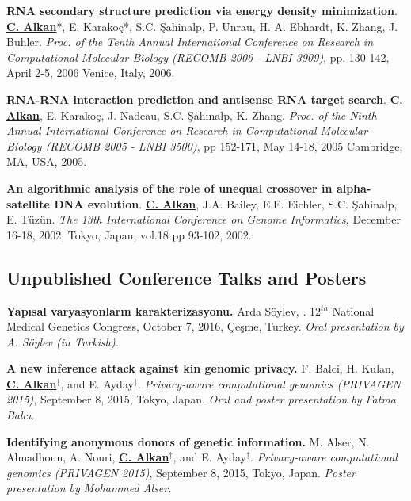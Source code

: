 \vspace{-.2cm}
{\bf RNA secondary structure prediction via energy density minimization}.
{\bf {\underline{C. Alkan}}}*, E. Karako\c{c}*, S.C. \c{S}ahinalp, P. Unrau,
H. A. Ebhardt, K. Zhang, J. Buhler.
{\em Proc. of the Tenth Annual International Conference on Research in Computational Molecular Biology
  (RECOMB 2006 - LNBI 3909)}, pp. 130-142,
  April 2-5, 2006 Venice, Italy, 2006.


\vspace{-.2cm}
 {\bf RNA-RNA interaction prediction and antisense RNA target search}.
  {\bf {\underline{C. Alkan}}}, E. Karako\c{c}, J. Nadeau, S.C. \c{S}ahinalp,
  K. Zhang.
  {\em Proc. of the Ninth Annual International Conference on Research in Computational Molecular Biology
    (RECOMB 2005 - LNBI 3500)}, pp 152-171, 
    May 14-18, 2005 Cambridge, MA, USA, 2005.

    \clearpage
    
\vspace{-.2cm}
 {\bf An algorithmic analysis of the role of unequal crossover in
  alpha-satellite DNA evolution}.
  {\bf {\underline{C. Alkan}}}, J.A. Bailey, E.E. Eichler, S.C. \c{S}ahinalp, E. T\"{u}z\"{u}n.
{\em The 13th International Conference on Genome Informatics}, 
December 16-18, 2002, Tokyo, Japan, vol.18 pp 93-102, 2002.

\vspace{-.4cm}
\subsection{\small \sc  Unpublished Conference Talks and Posters}

\vspace{-.2cm}
       {\bf Yapısal varyasyonların karakterizasyonu.} Arda Söylev, \calkan{}. 12$^{th}$ National Medical Genetics Congress, October 7, 2016, Çeşme, Turkey.
       {\it Oral presentation by A. Söylev (in Turkish).}
       
\vspace{-.2cm}
{\bf  A new inference attack against kin genomic privacy.}
F. Balci, H. Kulan, {\bf {\underline{C. Alkan}}}$^\ddag$, and E. Ayday$^\ddag$. 
{\em Privacy-aware computational genomics (PRIVAGEN 2015)}, 
 September 8, 2015, Tokyo, Japan. {\it Oral and poster presentation by Fatma Balcı.}

\vspace{-.2cm}
{\bf Identifying anonymous donors of genetic information.}
M. Alser, N. Almadhoun, A. Nouri, {\bf {\underline{C. Alkan}}}$^\ddag$, and E. Ayday$^\ddag$. 
{\em Privacy-aware computational genomics (PRIVAGEN 2015)}, 
 September 8, 2015, Tokyo, Japan. {\it Poster presentation by Mohammed Alser.}

